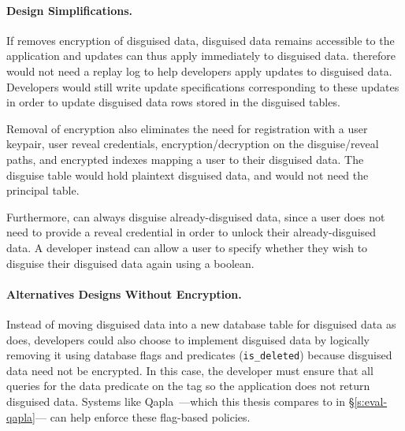 \paragraph{Design Simplifications.}
If \sys removes encryption of disguised data, disguised data remains accessible to
the application and updates can thus apply immediately to disguised data. \sys
therefore would not need a replay log to help developers apply updates to
disguised data. 
%
Developers would still write update specifications corresponding to these
updates in order to update disguised data rows stored in the disguised tables.
%

%
Removal of encryption also eliminates the need for registration with a user
keypair, user reveal credentials, encryption/decryption on the disguise/reveal
paths, and encrypted indexes mapping a user to their disguised data. The
disguise table would hold plaintext disguised data, and \sys would not need the
principal table.
%

%
Furthermore, \sys can always disguise already-disguised data, since a user does
not need to provide a reveal credential in order to unlock their
already-disguised data. A developer instead can allow a user to specify whether
they wish to disguise their disguised data again using a boolean.
%

%

%
\paragraph{Alternatives Designs Without Encryption.}
Instead of moving disguised data into a new database table for disguised data as
\sys does, developers could also choose to implement disguised data by logically
removing it using database flags and predicates (\eg \texttt{is\_deleted})
because disguised data need not be encrypted.
%
In this case, the developer must ensure that all queries for the data predicate
on the tag so the application does not return disguised data. Systems like
Qapla~\cite{qapla}---which this thesis compares to \sys in
\S\ref{s:eval-qapla}--- can help enforce these flag-based policies.

